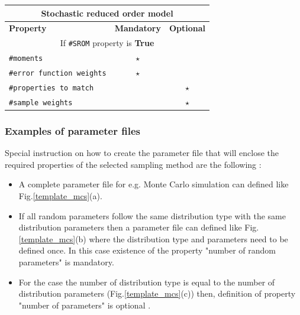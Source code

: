 \documentclass[preprint,12pt]{elsarticle}
\begin{document}
\begin{center}
	\begin{tabular}{ |l|c|c| } 
		\hline
		\multicolumn{3}{|c|}{\textbf{Stochastic reduced order model}} \\
		\hline
		\textbf{Property} & \textbf{Mandatory} & \textbf{Optional} \\
		\hline
		\multicolumn{3}{|c|}{If \texttt{\#SROM} property is \textbf{True}} \\
		\hline
		\texttt{\#moments}& $\star$ &   \\ 
		\hline
		\texttt{\#error function weights} & $\star$ &   \\ 
		\hline
		\texttt{\#properties to match}&  &  $\star$  \\ 
		\hline
		\texttt{\#sample weights}& & $\star$   \\ 
		\hline
	\end{tabular}
\end{center}


\subsubsection{Examples of parameter files}


\noindent
 Special instruction on how to create the parameter file that will enclose the required properties of the selected sampling method are the following :
 
 \begin{itemize}
 	 	\item  A complete parameter file for  e.g. Monte Carlo simulation can defined like Fig.\ref{template_mcs}(a).
 	
 	\item  If all random parameters follow the same distribution type with the same distribution parameters then a parameter file  can defined like Fig.\ref{template_mcs}(b) where the distribution type and parameters need to be defined once. In this case existence of the property  "number of random parameters" is mandatory.
 	
 	 \item  For the case the number of distribution type is equal to the number of distribution parameters (Fig.\ref{template_mcs}(c))  then, definition of property "number of parameters" is optional .
 	\end{itemize}
\end{document}
